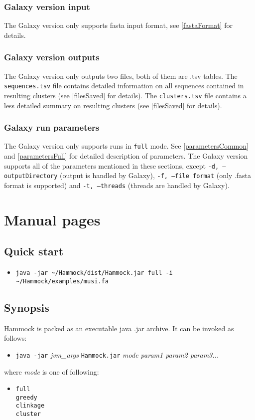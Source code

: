\documentclass[11pt, a4paper, twoside, titlepage]{article}
\begin{document}
\subsubsection{Galaxy version input}
The Galaxy version only supports fasta input format, see \ref{fastaFormat} for details.

\subsubsection{Galaxy version outputs}
The Galaxy version only outputs two files, both of them are .tsv tables. The \texttt{sequences.tsv} file contains detailed information on all sequences contained in resulting clusters (see \ref{filesSaved} for details). The \texttt{clusters.tsv} file contains a less detailed summary on resulting clusters (see \ref{filesSaved} for details).

\subsubsection{Galaxy run parameters}
The Galaxy version only supports runs in \texttt{full} mode. See \ref{parametersCommon} and \ref{parametersFull} for detailed description of parameters. The Galaxy version supports all of the parameters mentioned in these sections, except \texttt{-d, --outputDirectory} (output is handled by Galaxy),  \texttt{-f, --file format} (only .fasta format is supported) and \texttt{-t, --threads} (threads are handled by Galaxy).


\newpage

\section{Manual pages}
\label{manual}
\subsection{Quick start}
\label{quickStart}
\begin{itemize}
\item[]\verb|java -jar ~/Hammock/dist/Hammock.jar full -i ~/Hammock/examples/musi.fa|

\end{itemize}


\subsection{Synopsis}

Hammock is packed as an executable java .jar archive. It can be invoked as follows:
\begin{itemize}
	\item[]\verb|java -jar| \textit{jvm\_args} \verb|Hammock.jar| \textit{mode param1 param2 param3...}
\end{itemize}
where \textit{mode} is one of following: 
\begin{itemize}
	\item[] \verb|full|\\
			 \verb|greedy|\\
			 \verb|clinkage|\\
			 \verb|cluster|\\
\end{itemize}
\end{document}
